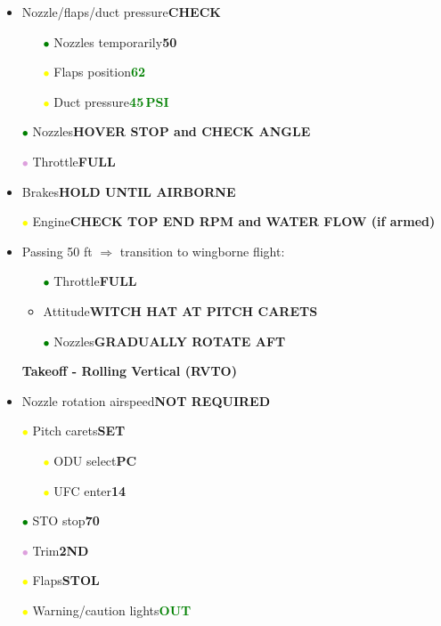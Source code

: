\documentclass[a4paper,12pt,dvipsnames]{letter}
\newcommand{\button}[1]{\textbf{#1}}
\newcommand{\Deg}{\textdegree{}}
\newcommand{\ok}[1]{\textcolor{Green}{\textbf{#1}}}
\newcommand{\gi}{\textcolor{Green}{$\bullet$\;}}
\newcommand{\yi}{\textcolor{Yellow}{$\bullet$\;}}
\newcommand{\vi}{\textcolor{Plum}{$\bullet$\;}}
\begin{document}
{\begin{itemize}
\begin{itemize}
\end{itemize}
\item Nozzle/flaps/duct pressure\dotfill\button{CHECK}
\begin{itemize}
 \item[\gi] Nozzles temporarily\dotfill\button{50\textdegree{}}
 \item[\yi] Flaps position\dotfill\ok{62\textdegree}
 \item[\yi] Duct pressure\dotfill\ok{45\,PSI}
\end{itemize}
\item[\gi] Nozzles\dotfill\button{HOVER STOP and CHECK ANGLE}
\item[\vi] Throttle\dotfill\button{FULL}
\item Brakes\dotfill\button{HOLD UNTIL AIRBORNE}
\item[\yi] Engine\dotfill\button{CHECK TOP END RPM and WATER FLOW (if armed)}
\item Passing 50 ft $\Rightarrow$ transition to wingborne flight:
\begin{itemize}
\item[\gi] Throttle\dotfill\button{FULL}
\item Attitude\dotfill\button{WITCH HAT AT PITCH CARETS}
\item[\gi] Nozzles\dotfill\button{GRADUALLY ROTATE AFT}
\end{itemize}
\end{itemize}
\newpage
\begin{itemize}
\item[] {\LARGE\textbf{Takeoff - Rolling Vertical (RVTO)}}
\item Nozzle rotation airspeed\dotfill\button{NOT REQUIRED}
\item[\yi] Pitch carets\dotfill\button{SET}
\begin{itemize}
 \item[\yi] ODU select\dotfill\button{PC}
 \item[\yi] UFC enter\dotfill\button{14}
\end{itemize}
\item[\gi] STO stop\dotfill\button{70\Deg}
\item[\vi] Trim\dotfill\button{2\Deg\;ND}
\item[\yi] Flaps\dotfill\button{STOL}
\item[\yi] Warning/caution lights\dotfill\ok{OUT}

\end{itemize}}
\end{document}
